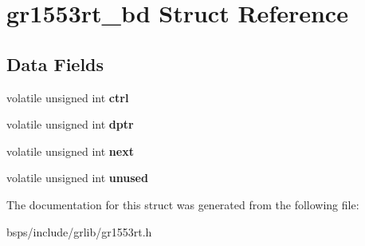 \hypertarget{structgr1553rt__bd}{}\section{gr1553rt\+\_\+bd Struct Reference}
\label{structgr1553rt__bd}
\subsection*{Data Fields}
\begin{DoxyCompactItemize}
\item 
\mbox{\label{structgr1553rt__bd_af75f19f1a32d0ec71287ead637e0f1d5}} 
volatile unsigned int {\bfseries ctrl}
\item 
\mbox{\label{structgr1553rt__bd_a8c612476eced8ab53ef45a7d14df62b9}} 
volatile unsigned int {\bfseries dptr}
\item 
\mbox{\label{structgr1553rt__bd_a0fde2dd3c76393e1b4dca486bf3c3662}} 
volatile unsigned int {\bfseries next}
\item 
\mbox{\label{structgr1553rt__bd_a08d75351d76b2bed89bf3b7238cdfeb4}} 
volatile unsigned int {\bfseries unused}
\end{DoxyCompactItemize}


The documentation for this struct was generated from the following file\+:\begin{DoxyCompactItemize}
\item 
bsps/include/grlib/gr1553rt.\+h\end{DoxyCompactItemize}
